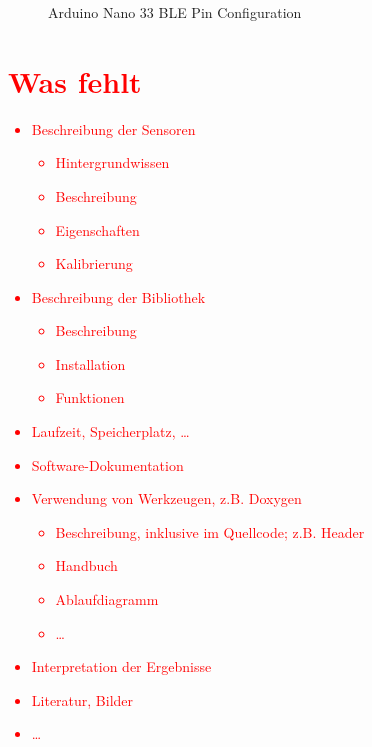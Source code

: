 \begin{figure}[ht]
    \centering
    \caption{Arduino Nano 33 BLE Pin Configuration}
    \label{Schnittstellen}
\end{figure}


\section{\textcolor{red}{Was fehlt}}

\textcolor{red}{
\begin{itemize}
  \item Beschreibung der Sensoren
    \begin{itemize}
      \item Hintergrundwissen
      \item Beschreibung
      \item Eigenschaften
      \item Kalibrierung
    \end{itemize}
  \item Beschreibung der Bibliothek
    \begin{itemize}
      \item Beschreibung
      \item Installation
      \item Funktionen
    \end{itemize}
  \item Laufzeit, Speicherplatz, \ldots
  \item Software-Dokumentation
  \item Verwendung von Werkzeugen, z.B. Doxygen
    \begin{itemize}
      \item Beschreibung, inklusive im Quellcode; z.B. Header
      \item Handbuch
      \item Ablaufdiagramm
      \item \ldots
\end{itemize}
\item Interpretation der Ergebnisse
\item Literatur, Bilder
\item \ldots
\end{itemize}
}


